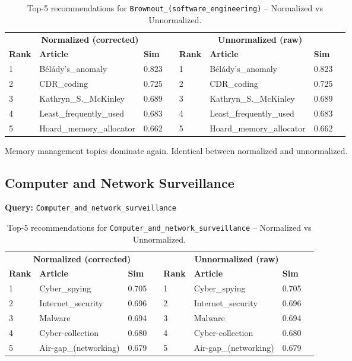 \documentclass[12pt,a4paper]{article}
\begin{document}
\begin{table}[H]
\centering
\caption{Top-5 recommendations for \texttt{Brownout\_(software\_engineering)} -- Normalized vs Unnormalized.}
\label{tab:brownout}
\begin{tabular}{lllr|lllr}
\toprule
\multicolumn{4}{c}{\textbf{Normalized (corrected)}} & \multicolumn{4}{c}{\textbf{Unnormalized (raw)}} \\
\cmidrule(lr){1-4}\cmidrule(lr){5-8}
\textbf{Rank} & \textbf{Article} & \textbf{Sim} & & \textbf{Rank} & \textbf{Article} & \textbf{Sim} \\
\midrule
1 & Bélády's\_anomaly & 0.823 & & 1 & Bélády's\_anomaly & 0.823 \\
2 & CDR\_coding & 0.725 & & 2 & CDR\_coding & 0.725 \\
3 & Kathryn\_S.\_McKinley & 0.689 & & 3 & Kathryn\_S.\_McKinley & 0.689 \\
4 & Least\_frequently\_used & 0.683 & & 4 & Least\_frequently\_used & 0.683 \\
5 & Hoard\_memory\_allocator & 0.662 & & 5 & Hoard\_memory\_allocator & 0.662 \\
\bottomrule
\end{tabular}
\end{table}

Memory management topics dominate again.  Identical between normalized and unnormalized.

\subsection{Computer and Network Surveillance}

\textbf{Query:} \texttt{Computer\_and\_network\_surveillance}

\begin{table}[H]
\centering
\caption{Top-5 recommendations for \texttt{Computer\_and\_network\_surveillance} -- Normalized vs Unnormalized.}
\label{tab:surveillance}
\begin{tabular}{lllr|lllr}
\toprule
\multicolumn{4}{c}{\textbf{Normalized (corrected)}} & \multicolumn{4}{c}{\textbf{Unnormalized (raw)}} \\
\cmidrule(lr){1-4}\cmidrule(lr){5-8}
\textbf{Rank} & \textbf{Article} & \textbf{Sim} & & \textbf{Rank} & \textbf{Article} & \textbf{Sim} \\
\midrule
1 & Cyber\_spying & 0.705 & & 1 & Cyber\_spying & 0.705 \\
2 & Internet\_security & 0.696 & & 2 & Internet\_security & 0.696 \\
3 & Malware & 0.694 & & 3 & Malware & 0.694 \\
4 & Cyber-collection & 0.680 & & 4 & Cyber-collection & 0.680 \\
5 & Air-gap\_(networking) & 0.679 & & 5 & Air-gap\_(networking) & 0.679 \\
\bottomrule
\end{tabular}
\end{table}
\end{document}
